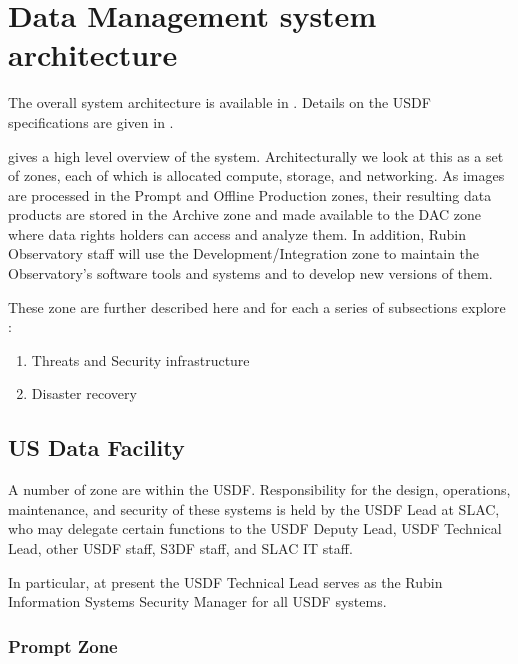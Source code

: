 

\section{Data Management system architecture} \label{sec:dparc}
The overall system architecture is available in .
Details on the \gls{USDF} specifications are given in .

 gives a high level overview of the system. Architecturally we look
at this as a set of zones, each of which is allocated compute, storage, and networking.
As images are processed in the Prompt and Offline Production zones, their resulting data products are stored in the \gls{Archive} zone and made available to the \gls{DAC} \gls{zone} where data rights holders can access and analyze them.
In addition, Rubin Observatory staff will use the Development/Integration zone to maintain the Observatory's \gls{software} tools and systems and to develop new versions of them.

These zone are further described here and for each a series of subsections explore :


\begin{enumerate}
\item Threats and Security infrastructure
\item Disaster recovery
\end{enumerate}

\subsection{US Data Facility}\label{sec:usdf}

A number of zone are within the \gls{USDF}.
Responsibility for the design, operations, maintenance, and security of these systems is held by the \gls{USDF} Lead at SLAC, who may delegate certain functions to the \gls{USDF} Deputy Lead, \gls{USDF} Technical Lead, other \gls{USDF} staff, S3DF staff, and SLAC IT staff.

In particular, at present the USDF Technical Lead serves as the Rubin Information Systems Security Manager for all USDF systems.

\subsubsection{Prompt Zone} \label{sec:promptenc}

